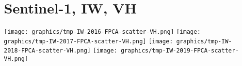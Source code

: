 
\section{Sentinel-1, IW, VH}
\setcounter{theorem}{0}

\renewcommand{\theenumi}{\roman{enumi}}
\renewcommand{\labelenumi}{\textnormal{(\theenumi)}$\;\;$}


\begin{center}
\begin{minipage}{7.0in}
\texttt{[image: graphics/tmp-IW-2016-FPCA-scatter-VH.png]}
\quad
\texttt{[image: graphics/tmp-IW-2017-FPCA-scatter-VH.png]}
\vskip 0.5cm
\texttt{[image: graphics/tmp-IW-2018-FPCA-scatter-VH.png]}
\quad
\texttt{[image: graphics/tmp-IW-2019-FPCA-scatter-VH.png]}
\end{minipage}
\end{center}


\renewcommand{\theenumi}{\roman{enumi}}
\renewcommand{\labelenumi}{\textnormal{(\theenumi)}$\;\;$}

